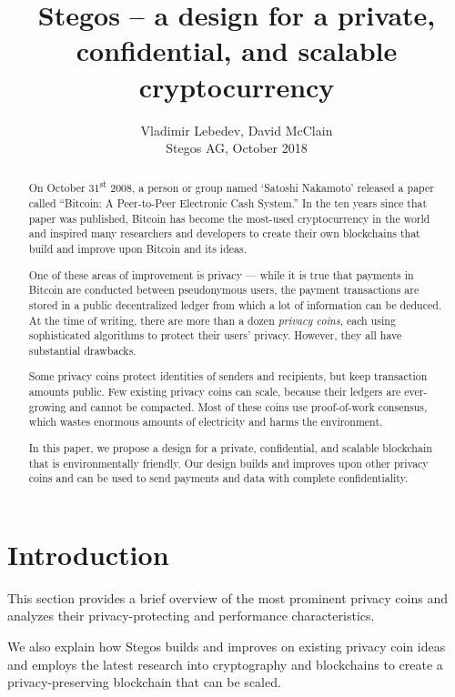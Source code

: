 \documentclass[a4paper, 10pt, conference]{ieeeconf}
\title{\LARGE \bf
Stegos  -- a design for a private, confidential, and scalable cryptocurrency}
\author{Vladimir Lebedev, David McClain\\Stegos AG, October 2018}%
\begin{document}
\maketitle
\thispagestyle{empty}
\pagestyle{plain}


\begin{abstract}
    On October 31\textsuperscript{st} 2008, a person or group named ‘Satoshi Nakamoto’ released a paper called ``Bitcoin: A Peer-to-Peer Electronic Cash System.''\cite{c1} In the ten years since that paper was published, Bitcoin has become the most-used cryptocurrency in the world and inspired many researchers and developers to create their own blockchains that build and improve upon Bitcoin and its ideas.
    
    One of these areas of improvement is privacy --- while it is true that payments in Bitcoin are conducted between pseudonymous users, the payment transactions are stored in a public decentralized ledger from which a lot of information can be deduced. At the time of writing, there are more than a dozen \textit{privacy coins}, each using sophisticated algorithms to protect their users' privacy. However, they all have substantial drawbacks. 
    
    Some privacy coins protect identities of senders and recipients, but keep transaction amounts public. Few existing privacy coins can scale, because their ledgers are ever-growing and cannot be compacted. Most of these coins use proof-of-work consensus, which wastes enormous amounts of electricity and harms the environment. 
    
    In this paper, we propose a design for a private, confidential, and scalable blockchain that is environmentally friendly. Our design builds and improves upon other privacy coins and can be used to send payments and data with complete confidentiality. 
\end{abstract}

\section{Introduction}
This section provides a brief overview of the most prominent privacy coins and analyzes their privacy-protecting and performance characteristics.

We also explain how Stegos builds and improves on existing privacy coin ideas and employs the latest research into cryptography and blockchains to create a privacy-preserving blockchain that can be scaled. 
\end{document}
